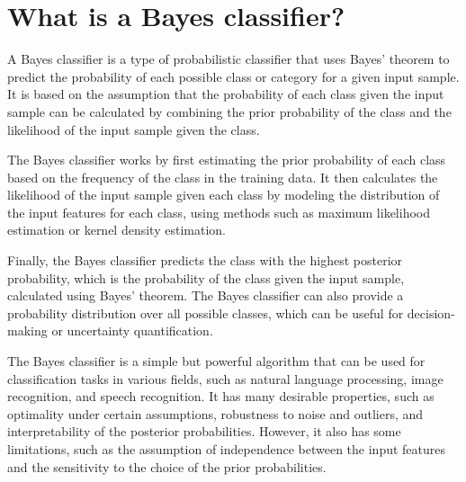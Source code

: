 \section{What is a Bayes classifier?}
A Bayes classifier is a type of probabilistic classifier that uses Bayes' theorem to predict the probability of each possible class or category for a given input sample. It is based on the assumption that the probability of each class given the input sample can be calculated by combining the prior probability of the class and the likelihood of the input sample given the class.

The Bayes classifier works by first estimating the prior probability of each class based on the frequency of the class in the training data. It then calculates the likelihood of the input sample given each class by modeling the distribution of the input features for each class, using methods such as maximum likelihood estimation or kernel density estimation.

Finally, the Bayes classifier predicts the class with the highest posterior probability, which is the probability of the class given the input sample, calculated using Bayes' theorem. The Bayes classifier can also provide a probability distribution over all possible classes, which can be useful for decision-making or uncertainty quantification.

The Bayes classifier is a simple but powerful algorithm that can be used for classification tasks in various fields, such as natural language processing, image recognition, and speech recognition. It has many desirable properties, such as optimality under certain assumptions, robustness to noise and outliers, and interpretability of the posterior probabilities. However, it also has some limitations, such as the assumption of independence between the input features and the sensitivity to the choice of the prior probabilities.

